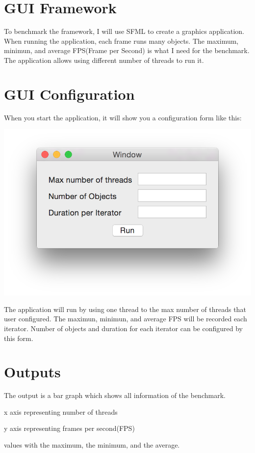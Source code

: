 \hypertarget{_benchmark_program_design_BenchmarkProgramDesignGUIFramework}{}\section{G\+U\+I Framework}\label{_benchmark_program_design_BenchmarkProgramDesignGUIFramework}
To benchmark the framework, I will use S\+F\+M\+L to create a graphics application. When running the application, each frame runs many objects. The maximum, minimun, and average F\+P\+S(\+Frame per Second) is what I need for the benchmark. The application allows using different number of threads to run it.\hypertarget{_benchmark_program_design_BenchmarkProgramDesignGUIConfiguration}{}\section{G\+U\+I Configuration}\label{_benchmark_program_design_BenchmarkProgramDesignGUIConfiguration}
When you start the application, it will show you a configuration form like this\+: 
\begin{DoxyImageNoCaption}
  \mbox{\includegraphics[width=\textwidth,height=\textheight/2,keepaspectratio=true]{DesignBenchmarkProgramDesignGUIConfiguration.png}}
\end{DoxyImageNoCaption}
 The application will run by using one thread to the max number of threads that user configured. The maximun, minimun, and average F\+P\+S will be recorded each iterator. Number of objects and duration for each iterator can be configured by this form.\hypertarget{_benchmark_program_design_BenchmarkProgramDesignOutputs}{}\section{Outputs}\label{_benchmark_program_design_BenchmarkProgramDesignOutputs}
The output is a bar graph which shows all information of the benchmark.
\begin{DoxyItemize}
\item x axis representing number of threads
\item y axis representing frames per second(\+F\+P\+S)
\item values with the maximum, the minimum, and the average.
\end{DoxyItemize}


